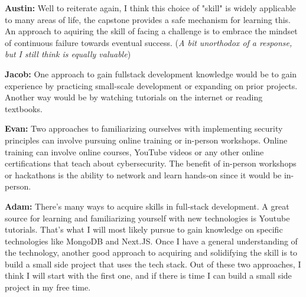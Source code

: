 \documentclass[12pt]{article}
\begin{document}
\begin{enumerate}
  \textbf{Austin: } Well to reiterate again, I think this choice of "skill" is widely applicable to many areas of life, the capstone provides a safe mechanism for learning this. An approach to aquiring the skill of facing a challenge is to embrace the mindset of continuous failure towards eventual success. (\textit{A bit unorthodox of a response, but I still think is equally valuable})
  
  \textbf{Jacob: } One approach to gain fullstack development knowledge would be to gain experience by practicing small-scale development or expanding on prior projects. Another way would be by watching tutorials on the internet or reading textbooks.
  
  \textbf{Evan: } Two approaches to familiarizing ourselves with implementing security principles can involve pursuing online training or in-person workshops. Online training can involve online courses, YouTube videos or any other online certifications that teach about cybersecurity. The benefit of in-person workshops or hackathons is the ability to network and learn hands-on since it would be in-person.

  \textbf{Adam:} There's many ways to acquire skills in full-stack development. A great source for learning and familiarizing yourself with new technologies is Youtube tutorials. That's what I will most likely pursue to gain knowledge on specific technologies like MongoDB and Next.JS. Once I have a general understanding of the technology, another good approach to acquiring and solidifying the skill is to build a small side project that uses the tech stack. Out of these two approaches, I think I will start with the first one, and if there is time I can build a small side project in my free time.
\end{enumerate}
\end{document}
